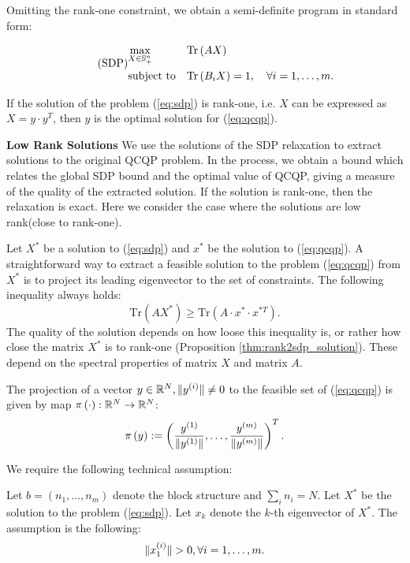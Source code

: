 Omitting the rank-one constraint, we obtain a semi-definite program in standard form:

\begin{equation}\label{eq:sdp}
\tag{SDP}
\begin{aligned}
& \underset{X \in \mathbb{S}_{+}^n}{\text{max}}
& &\mathrm{Tr}\left(A X\right) \\
& \text{subject to}
& &\mathrm{Tr}\left(B_i X\right) = 1,  \quad\forall i =1,\ldots,m.\\
\end{aligned}
\end{equation}

\begin{remark}
If the solution of the problem (\ref{eq:sdp}) is rank-one, i.e. $X$ can be expressed as $X = y \cdot y^T$, 
then $y$ is the optimal solution for (\ref{eq:qcqp}).
\end{remark}

\noindent\textbf{Low Rank Solutions}
We use the solutions of the SDP relaxation to extract solutions to
the original QCQP problem. In the process, we obtain a bound which relates
the global SDP bound and the optimal value of QCQP, giving a measure of
the quality of the extracted solution. If the solution is
rank-one, then the relaxation is exact. Here we consider the case where the solutions are
 low rank(close to rank-one).

Let $X^*$ be a solution to (\ref{eq:sdp}) and $x^{*}$ be the solution
to (\ref{eq:qcqp}).
A straightforward way to extract a feasible solution to the problem
(\ref{eq:qcqp}) from $X^*$ is to project its leading eigenvector to
the set of constraints.  The following inequality always holds:
 $$\mathrm{Tr}\left(A X^{*}\right) \geq \mathrm{Tr}\left(A \cdot x^{*} \cdot x^{*T}\right).$$
The quality of the solution depends on how loose this inequality is,
or rather how close the matrix $X^*$ is to rank-one (Proposition \ref{thm:rank2sdp_solution}). 
These depend on the spectral properties of matrix
$X$ and matrix $A$.

The projection of a vector $y \in \mathbb{R}^N, \lVert y^{(i)}\rVert \neq 0$ to the 
feasible set of (\ref{eq:qcqp}) is given by map $\pi\left(\cdot\right) : \mathbb{R}^N \rightarrow \mathbb{R}^N$:
$$\pi\left(y\right) := \left(\frac{y^{(1)}}{\lVert y^{(1)}\rVert}, \ldots, \frac{y^{(m)}}{\lVert y^{(m)}\rVert}\right)^T.$$

We require the following technical assumption:
\begin{assumption}\label{thm:assumption1}
Let $b = \left(n_1,\ldots,n_m\right)$ denote the block structure and $ \sum_i n_i = N $.
Let $X^*$ be the solution to the problem (\ref{eq:sdp}). Let $x_k$ denote the $k$-th 
eigenvector of $X^*$. The assumption is the following: 
$$\lVert x_1^{(i)}\rVert > 0, \forall i = 1,\ldots, m.$$
\end{assumption}

